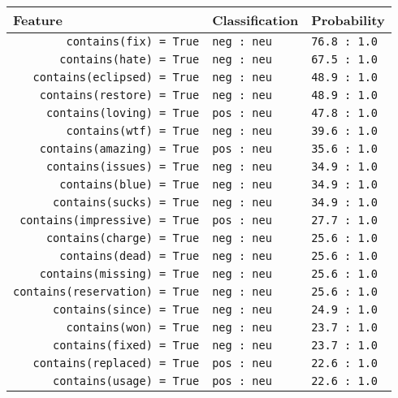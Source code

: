 \begin{tabular}{|l|l|l|}
\hline
Feature & Classification & Probability \\
\hline
\verb'        contains(fix) = True' & \verb'neg : neu' & \verb'76.8 : 1.0' \\
\verb'       contains(hate) = True' & \verb'neg : neu' & \verb'67.5 : 1.0' \\
\verb'   contains(eclipsed) = True' & \verb'neg : neu' & \verb'48.9 : 1.0' \\
\verb'    contains(restore) = True' & \verb'neg : neu' & \verb'48.9 : 1.0' \\
\verb'     contains(loving) = True' & \verb'pos : neu' & \verb'47.8 : 1.0' \\
\verb'        contains(wtf) = True' & \verb'neg : neu' & \verb'39.6 : 1.0' \\
\verb'    contains(amazing) = True' & \verb'pos : neu' & \verb'35.6 : 1.0' \\
\verb'     contains(issues) = True' & \verb'neg : neu' & \verb'34.9 : 1.0' \\
\verb'       contains(blue) = True' & \verb'neg : neu' & \verb'34.9 : 1.0' \\
\verb'      contains(sucks) = True' & \verb'neg : neu' & \verb'34.9 : 1.0' \\
\verb' contains(impressive) = True' & \verb'pos : neu' & \verb'27.7 : 1.0' \\
\verb'     contains(charge) = True' & \verb'neg : neu' & \verb'25.6 : 1.0' \\
\verb'       contains(dead) = True' & \verb'neg : neu' & \verb'25.6 : 1.0' \\
\verb'    contains(missing) = True' & \verb'neg : neu' & \verb'25.6 : 1.0' \\
\verb'contains(reservation) = True' & \verb'neg : neu' & \verb'25.6 : 1.0' \\
\verb'      contains(since) = True' & \verb'neg : neu' & \verb'24.9 : 1.0' \\
\verb'        contains(won) = True' & \verb'neg : neu' & \verb'23.7 : 1.0' \\
\verb'      contains(fixed) = True' & \verb'neg : neu' & \verb'23.7 : 1.0' \\
\verb'   contains(replaced) = True' & \verb'pos : neu' & \verb'22.6 : 1.0' \\
\verb'      contains(usage) = True' & \verb'pos : neu' & \verb'22.6 : 1.0' \\
\hline
\end{tabular}
